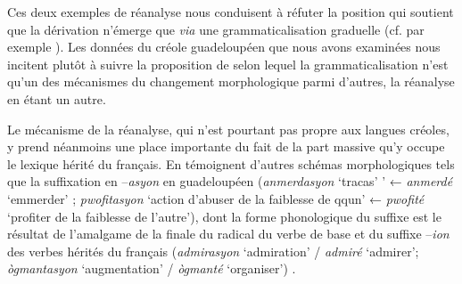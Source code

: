 \documentclass[output=paper]{langsci/langscibook}
\begin{document}
Ces deux exemples de réanalyse nous conduisent à réfuter la position qui
soutient que la dérivation n'émerge que \emph{via} une
grammaticalisation graduelle (cf. par exemple %
\citealt{McWhorter1998}%
). Les
données du créole guadeloupéen que nous avons examinées nous incitent
plutôt à suivre la proposition de %
\citet{Rainer15} %
%
selon lequel la
grammaticalisation n'est qu'un des mécanismes du changement
morphologique parmi d'autres, la réanalyse en étant un autre.

Le mécanisme de la réanalyse, qui n'est pourtant pas propre aux langues
créoles, y prend néanmoins une place importante du fait de la part
massive qu'y occupe le lexique hérité du français. En témoignent
d'autres schémas morphologiques tels que la suffixation en
--\emph{asyon} en guadeloupéen (\emph{anmerdasyon} `tracas' ' ← \emph{anmerdé} `emmerder' ; \emph{pwofitasyon} `action d'abuser de la
faiblesse de qqun' ← \emph{pwofité} `profiter de la faiblesse de
l'autre'), dont la forme phonologique du suffixe est le résultat de
l'amalgame de la finale du radical du verbe de base et du suffixe
--\emph{ion} des verbes hérités du français (\emph{admirasyon}
`admiration' / \emph{admiré} `admirer'; \emph{ògmantasyon}
`augmentation' / \emph{ògmanté} `organiser') %
\citep{Villoing17}%
%
.

\nocite{Amiot08}
\nocite{Anderson92}
\nocite{Apotheloz2002}
\nocite{Apotheloz2007}
\nocite{Aronoff94}
\nocite{Bechade92}
\nocite{Bhatt00}
\nocite{Bernabe87}
\nocite{booij1977.dutch-morphology}
\nocite{Booij10}
\nocite{Brousseau11}
\nocite{Chaudenson96}
\nocite{Chevalier64}
\nocite{Corbin87}
\nocite{corbin04}
\nocite{Croft91}
\nocite{Daladier99}
\nocite{darmesteter1894.traite-formation}
\nocite{DeGraff2001}
\nocite{Dell70}
\nocite{dubois62}
\nocite{Filipovich87}
\nocite{Fradin03}
\nocite{Fradin2009}
\nocite{Gardes-Tamine1988}
\nocite{Gerhard-Krait00}
\nocite{Gerhard-Krait12}
\nocite{Germain76}
\nocite{Grevisse1988}
\nocite{Guilbert1975}
\nocite{Haspelmath2002}
\nocite{Haspelmath1995}
\nocite{Huot06}
\nocite{kerleroux96}
\nocite{Kerleroux2000}
\nocite{Jespersen22}
\nocite{Langacker77}
\nocite{Lass90}
\nocite{Lefebvre98}
\nocite{Lefebvre2003}
\nocite{Lignon14}
\nocite{Ludwig12}
\nocite{Lyons77}
\nocite{McWhorter1998}
\nocite{Matthews91}
\nocite{Meyer-Lubke}
\nocite{Melcuk1996}
\nocite{Mufwene89}
\nocite{Muller90}
\nocite{Namer09}
\nocite{Namer12}
\nocite{namer2013}
\nocite{Nyrop36}
\nocite{Plag1999}
\nocite{Plag03}
\nocite{Poullet84}
\nocite{Rainer15}
\nocite{Scalise1994}
\nocite{Seuren86}
\nocite{Thibault12}
\nocite{Tourneux90}
\nocite{Tribout2010a}
\nocite{Tribout2014}
\nocite{Valdman78}
\nocite{Valdman1981}
\nocite{Vandeloise1986}
\nocite{Villoing16}
\nocite{Villoing17}
\nocite{Zribi-Hertz72}



{\sloppy
\printbibliography[heading=subbibliography,notkeyword=this]
}
\end{document}
